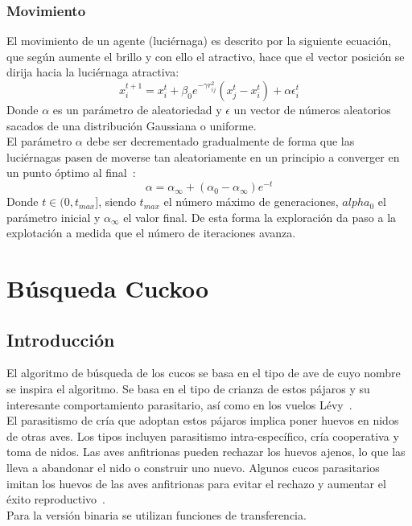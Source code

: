\subsubsection{Movimiento}
El movimiento de un agente (luciérnaga) es descrito por la siguiente ecuación, que según aumente el brillo y con ello el atractivo, hace que el vector posición se dirija hacia la luciérnaga atractiva:
\begin{equation}
    x_i^{t+1} = x_i^t + \beta_0e^{-\gamma r_{ij}^2}(x_j^t-x_i^t)+\alpha\epsilon_i^t
\end{equation}
Donde $\alpha$ es un parámetro de aleatoriedad y $\epsilon$ un vector de números aleatorios sacados de una distribución Gaussiana o uniforme. \\[6pt]
El parámetro $\alpha$ debe ser decrementado gradualmente de forma que las luciérnagas pasen de moverse tan aleatoriamente en un principio a converger en un punto óptimo al final~\cite{yang_chapter_2014}:
\begin{equation}
    \alpha = \alpha_\infty + (\alpha_0-\alpha_\infty)e^{-t}
\end{equation}
Donde $t\in(0,t_{max}]$, siendo $t_{max}$ el número máximo de generaciones, $alpha_0$ el parámetro inicial y $\alpha_\infty$ el valor final. De esta forma la exploración da paso a la explotación a medida que el número de iteraciones avanza.

\section{Búsqueda Cuckoo}
\subsection{Introducción}
El algoritmo de búsqueda de los cucos se basa en el tipo de ave de cuyo nombre se inspira el algoritmo. Se basa en el tipo de crianza de estos pájaros y su interesante comportamiento parasitario, así como en los vuelos Lévy~\cite{noauthor_levy_nodate}.\\[6pt]
El parasitismo de cría que adoptan estos pájaros implica poner huevos en nidos de otras aves. Los tipos incluyen parasitismo intra-específico, cría cooperativa y toma de nidos. Las aves anfitrionas pueden rechazar los huevos ajenos, lo que las lleva a abandonar el nido o construir uno nuevo. Algunos cucos parasitarios imitan los huevos de las aves anfitrionas para evitar el rechazo y aumentar el éxito reproductivo~\cite{yang_cuckoo_2010}.\\[6pt]
Para la versión binaria se utilizan funciones de transferencia.
